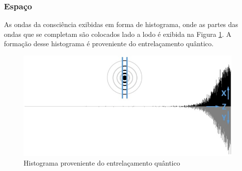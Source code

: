\subsubsection{Espaço}
As ondas da consciência exibidas em forma de histograma, onde as partes das ondas que se completam são colocados lado a lodo é exibida na Figura \ref{fig:consciousness_space_waves}. A formação desse histograma é proveniente do entrelaçamento quântico.
\begin{figure}[H]
\caption{Histograma proveniente do entrelaçamento quântico}
\label{fig:consciousness_space_waves}
\centering
\includegraphics[scale=.7]{sections/images/consciousness_space_waves.jpg}
\end{figure}

